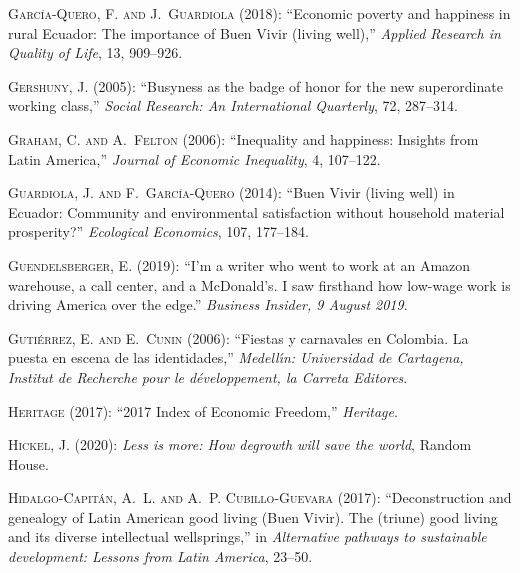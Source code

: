 \documentclass[10pt, letterpaper]{article}
\begin{document}
\begin{spacing}{2}
\begin{thebibliography}{120}
\textsc{Garc{\'\i}a-Quero, F. and J.~Guardiola} (2018): \enquote{Economic
  poverty and happiness in rural Ecuador: The importance of Buen Vivir (living
  well),} \emph{Applied Research in Quality of Life}, 13, 909--926.

\textsc{Gershuny, J.} (2005): \enquote{Busyness as the badge of honor for the
  new superordinate working class,} \emph{Social Research: An International
  Quarterly}, 72, 287--314.

\textsc{Graham, C. and A.~Felton} (2006): \enquote{Inequality and happiness:
  Insights from Latin America,} \emph{Journal of Economic Inequality}, 4,
  107--122.

\textsc{Guardiola, J. and F.~Garc{\'\i}a-Quero} (2014): \enquote{Buen Vivir
  (living well) in Ecuador: Community and environmental satisfaction without
  household material prosperity?} \emph{Ecological Economics}, 107, 177--184.

\textsc{Guendelsberger, E.} (2019): \enquote{I'm a writer who went to work at
  an Amazon warehouse, a call center, and a McDonald's. I saw firsthand how
  low-wage work is driving America over the edge.} \emph{Business Insider, 9
  August 2019}.

\textsc{Guti{\'e}rrez, E. and E.~Cunin} (2006): \enquote{Fiestas y carnavales
  en Colombia. La puesta en escena de las identidades,} \emph{Medell{\'\i}n:
  Universidad de Cartagena, Institut de Recherche pour le d{\'e}veloppement, la
  Carreta Editores}.

\textsc{Heritage} (2017): \enquote{2017 Index of Economic Freedom,}
  \emph{Heritage}.

\textsc{Hickel, J.} (2020): \emph{Less is more: How degrowth will save the
  world}, Random House.

\textsc{Hidalgo-Capit{\'a}n, A.~L. and A.~P. Cubillo-Guevara} (2017):
  \enquote{Deconstruction and genealogy of Latin American good living (Buen
  Vivir). The (triune) good living and its diverse intellectual wellsprings,}
  in \emph{Alternative pathways to sustainable development: Lessons from Latin
  America}, 23--50.


\end{thebibliography}
\end{spacing}
\end{document}
